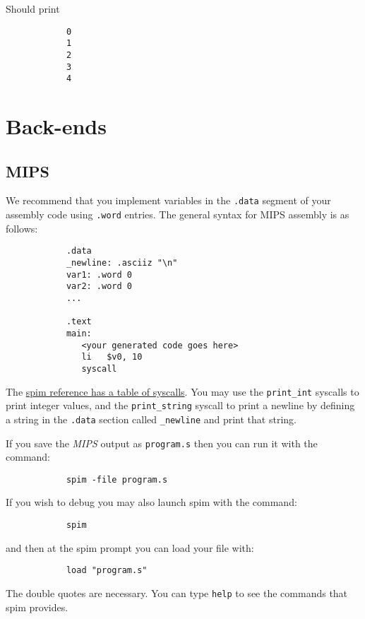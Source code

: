\documentclass{article}
\newcommand{\code}[1]{\texttt{\textmd{#1}}}
\begin{document}
		Should print

		\begin{lstlisting}
			0
			1
			2
			3
			4
		\end{lstlisting}

\section{Back-ends}

	\subsection{MIPS}

		We recommend that you implement variables in the \code{.data} segment of your assembly code using \code{.word} entries. The
		general syntax for MIPS assembly is as follows:

		\begin{lstlisting}
			.data
			_newline: .asciiz "\n"
			var1: .word 0
			var2: .word 0
			...

			.text
			main:
			   <your generated code goes here>
			   li   $v0, 10
			   syscall
		\end{lstlisting}

		The \href{https://www.cs.tcd.ie/\string~waldroj/itral/spim_ref.html}{spim reference has a table of syscalls}.
		You may use the \texttt{print\_int} syscalls to print integer values, and the \texttt{print\_string} syscall to
		print a newline by defining a string in the \texttt{.data} section called \texttt{\_newline} and print that
		string.

		If you save the \textit{MIPS} output as \code{program.s} then you can run it with the command:

		\begin{lstlisting}
			spim -file program.s
		\end{lstlisting}

		If you wish to debug you may also launch spim with the command:

		\begin{lstlisting}
			spim
		\end{lstlisting}

		and then at the spim prompt you can load your file with:

		\begin{lstlisting}
			load "program.s"
		\end{lstlisting}

		The double quotes are necessary. You can type \texttt{help} to see the commands that spim provides.
\end{document}
